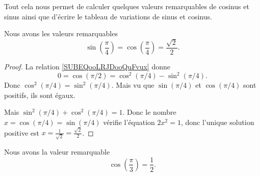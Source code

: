 Tout cela nous permet de calculer quelques valeurs remarquables de cosinus et sinus ainsi que d'écrire le tableau de variations de sinus et cosinus.

\begin{lemma}       \label{LEMooIGNPooPEctJy}
    Nous avons les valeurs remarquables
    \begin{equation}
        \sin(\frac{ \pi }{ 4 })=\cos(\frac{ \pi }{ 4 })=\frac{ \sqrt{ 2 } }{2}.
    \end{equation}
\end{lemma}

\begin{proof}
    La relation \eqref{SUBEQooLRJDooQuFvux} donne
    \begin{equation}
        0=\cos(\pi/2)=\cos^2(\pi/4)-\sin^2(\pi/4).
    \end{equation}
    Donc \( \cos^2(\pi/4)=\sin^2(\pi/4)\). Mais vu que \( \sin(\pi/4)\) et \( \cos(\pi/4)\) sont positifs, ils sont égaux.

    Mais \( \sin^2(\pi/4)+\cos^2(\pi/4)=1\). Donc le nombre \( x=\cos(\pi/4)=\sin(\pi/4)\) vérifie l'équation \( 2x^2=1\), donc l'unique solution positive est \( x=\frac{1}{ \sqrt{ 2 } }=\frac{ \sqrt{ 2 } }{2}\).
\end{proof}

\begin{lemma}       \label{LEMooRMHAooDEAPMw}
    Nous avons la valeur remarquable
    \begin{equation}
        \cos(\frac{ \pi }{ 3 })=\frac{ 1 }{2}.
    \end{equation}
\end{lemma}

